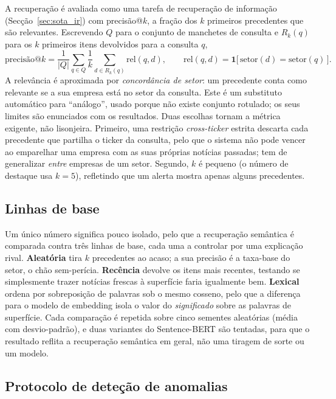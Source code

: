 A recuperação é avaliada como uma tarefa de recuperação de informação (Secção~\ref{sec:sota_ir}) com
precisão@$k$, a fração dos $k$ primeiros precedentes que são relevantes. Escrevendo $Q$ para o conjunto de
manchetes de consulta e $R_k(q)$ para os $k$ primeiros itens devolvidos para a consulta $q$,
\begin{equation}
\text{precisão@}k = \frac{1}{|Q|}\sum_{q\in Q}\frac{1}{k}\sum_{d\in R_k(q)} \mathrm{rel}(q,d),
\qquad
\mathrm{rel}(q,d)=\mathbf{1}\big[\,\mathrm{setor}(d)=\mathrm{setor}(q)\,\big].
\label{eq:precatk}
\end{equation}
A relevância é aproximada por \emph{concordância de setor}: um precedente conta como relevante se a sua
empresa está no setor da consulta. Este é um substituto automático para ``análogo'', usado porque não existe
conjunto rotulado; os seus limites são enunciados com os resultados. Duas escolhas tornam a métrica
exigente, não lisonjeira. Primeiro, uma restrição \emph{cross-ticker} estrita descarta cada precedente que
partilha o ticker da consulta, pelo que o sistema não pode vencer ao emparelhar uma empresa com as suas
próprias notícias passadas; tem de generalizar \emph{entre} empresas de um setor. Segundo, $k$ é pequeno (o
número de destaque usa $k=5$), refletindo que um alerta mostra apenas alguns precedentes.

\subsection{Linhas de base}
\label{sec:met_eval_baselines}

Um único número significa pouco isolado, pelo que a recuperação semântica é comparada contra três linhas de
base, cada uma a controlar por uma explicação rival. \textbf{Aleatória} tira $k$ precedentes ao acaso; a sua
precisão é a taxa-base do setor, o chão sem-perícia. \textbf{Recência} devolve os itens mais recentes,
testando se simplesmente trazer notícias frescas à superfície faria igualmente bem. \textbf{Lexical} ordena
por sobreposição de palavras sob o mesmo cosseno, pelo que a diferença para o modelo de embedding isola o
valor do \emph{significado} sobre as palavras de superfície. Cada comparação é repetida sobre cinco sementes
aleatórias (média com desvio-padrão), e duas variantes do Sentence-BERT são tentadas, para que o resultado
reflita a recuperação semântica em geral, não uma tiragem de sorte ou um modelo.

\subsection{Protocolo de deteção de anomalias}
\label{sec:met_eval_anomaly}

